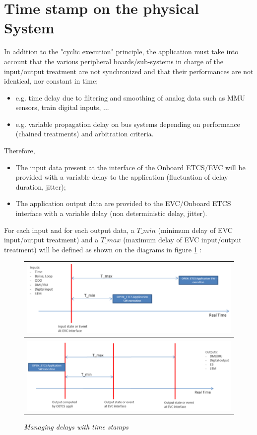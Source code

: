 \documentclass[oneside]{template/openetcs_report}
\begin{document}
\section{Time stamp on the physical System}

In addition to the "cyclic execution" principle, the application must take into account that the various peripheral boards/sub-systems in charge of the input/output treatment are not synchronized and that their performances are not identical, nor constant in time;
\begin{itemize}
	\item e.g. time delay due to filtering and smoothing of analog data such as MMU sensors, train digital inputs, ...
	\item e.g. variable propagation delay on bus systems depending on performance (chained treatments) and arbitration criteria.
\end{itemize}
Therefore,
\begin{itemize}
	\item The input data present at the interface of the Onboard ETCS/\gls{EVC} will be provided with a variable delay to the application (fluctuation of delay duration, jitter);
	\item The application output data are provided to the \gls{EVC}/Onboard ETCS interface with a variable delay (non deterministic delay, jitter).
\end{itemize}
For each input and for each output data, a $T\_{min}$ (minimum delay of \gls{EVC} input/output treatment) and a $T\_{max}$ (maximum delay of \gls{EVC} input/output treatment) will be defined as shown on the diagrams in figure \ref{fig:timestamp} :
\begin{figure}[!ht]
	\begin{tabular}{c}
		\includegraphics[angle=-0,width=.7\textwidth]{api_2a.png}\\
		\hline\\
		\includegraphics[angle=-0,width=.7\textwidth]{api_1a.png}
	\end{tabular}
	\caption{\emph{Managing delays with time stamps}}
	\label {fig:timestamp}
\end{figure}
\end{document}
